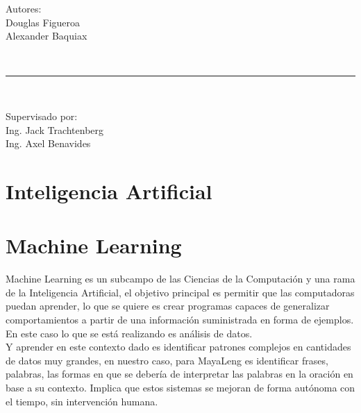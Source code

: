 \documentclass[a4paper,openright,11pt]{article}
\begin{document}
\begin{titlepage}
\begin{center}
		\vspace*{0.9in}
		\begin{large}
			Autores:\\
			Douglas Figueroa \\
			Alexander Baquiax
		\end{large}
		\vspace*{0.3in}
		\\
		\rule{90mm}{0.1mm}\\
		\begin{large}
			Supervisado por: \\
			Ing. Jack Trachtenberg \\
			Ing. Axel Benavides
		\end{large}
	\end{center}
\end{titlepage}
\newpage

\tableofcontents

\newpage

\pagestyle{fancy}


\section{Inteligencia Artificial}
\newpage

\section{Machine Learning}
Machine Learning es un subcampo de las Ciencias de la Computación y una rama de la Inteligencia Artificial, el objetivo principal es permitir que las computadoras puedan aprender, lo que se quiere es crear programas capaces de generalizar comportamientos a partir de una información suministrada en forma de ejemplos. En este caso lo que se está realizando es análisis de datos.\\

Y aprender en este contexto dado es identificar patrones complejos en cantidades de datos muy grandes, en nuestro caso, para MayaLeng es identificar frases, palabras, las formas en que se debería de interpretar las palabras en la oración en base a su contexto. Implica que estos sistemas se mejoran de forma autónoma con el tiempo, sin intervención humana.\\
\end{document}
